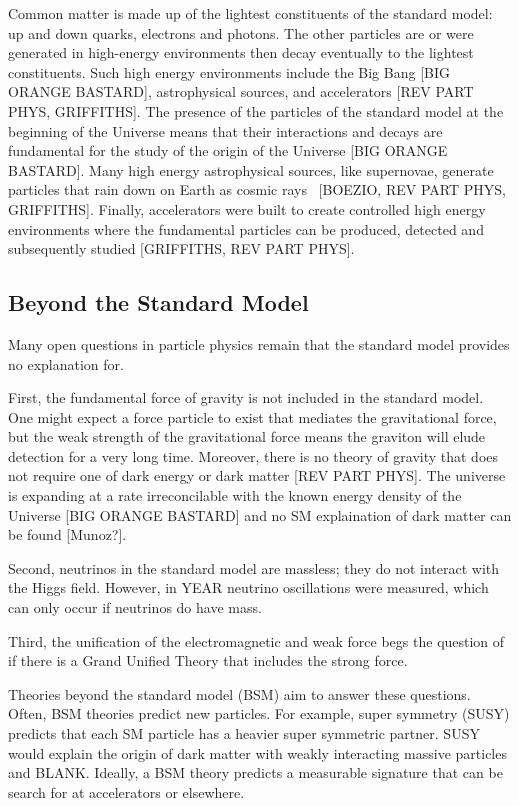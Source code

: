 Common matter is made up of the lightest constituents of the standard model: up and down quarks, electrons and photons. The other particles are or were generated in high-energy environments then decay eventually to the lightest constituents. Such high energy environments include the Big Bang [BIG ORANGE BASTARD], astrophysical sources, and accelerators [REV PART PHYS, GRIFFITHS]. The presence of the particles of the standard model at the beginning of the Universe means that their interactions and decays are fundamental for the study of the origin of the Universe [BIG ORANGE BASTARD]. Many high energy astrophysical sources, like supernovae, generate particles that rain down on Earth as cosmic rays~\cite{boezio_chemical_2012} [BOEZIO, REV PART PHYS, GRIFFITHS]. Finally, accelerators were built to create controlled high energy environments where the fundamental particles can be produced, detected and subsequently studied [GRIFFITHS, REV PART PHYS].

\subsection{Beyond the Standard Model}

Many open questions in particle physics remain that the standard model provides no explanation for.

First, the fundamental force of gravity is not included in the standard model. One might expect a force particle to exist that mediates the gravitational force, but the weak strength of the gravitational force means the graviton will elude detection for a very long time. Moreover, there is no theory of gravity that does not require one of dark energy or dark matter [REV PART PHYS]. The universe is expanding at a rate irreconcilable with the known energy density of the Universe [BIG ORANGE BASTARD] and no SM explaination of dark matter can be found [Munoz?]. 

Second, neutrinos in the standard model are massless; they do not interact with the Higgs field. However, in YEAR neutrino oscillations were measured, which can only occur if neutrinos do have mass. 

Third, the unification of the electromagnetic and weak force begs the question of if there is a Grand Unified Theory that includes the strong force. 

Theories beyond the standard model (BSM) aim to answer these questions. Often, BSM theories predict new particles. For example, super symmetry (SUSY) predicts that each SM particle has a heavier super symmetric partner. SUSY would explain the origin of dark matter with weakly interacting massive particles and BLANK. Ideally, a BSM theory predicts a measurable signature that can be search for at accelerators or elsewhere.

